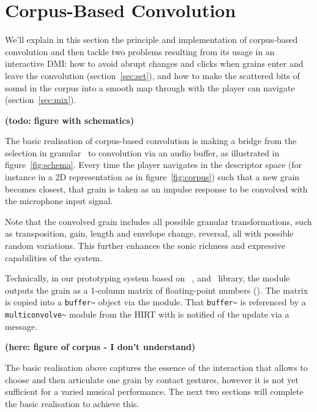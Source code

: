 \section{Corpus-Based Convolution} %

We'll explain in this section the principle and implementation of corpus-based convolution and then tackle two problems resulting from its usage in an interactive DMI: 
how to avoid abrupt changes and clicks when grains enter and leave the convolution (section~\ref{sec:set}), and
how to make the scattered bits of sound in the corpus into a smooth map through with the player can navigate (section~\ref{sec:mix}).


\textbf{(todo: figure with schematics)}

The basic realisation of corpus-based convolution is making a bridge from the selection in granular \cbcs\ to convolution via an audio buffer, as illustrated in figure~\ref{fig:schema}.  Every time the player navigates in the descriptor space (for instance in a 2D representation as in figure~\ref{fig:corpus}) such that a new grain becomes closest, that grain is taken as an impulse response to be convolved with the microphone input signal.

Note that the convolved grain includes all possible granular transformations, such as transposition, gain, length and envelope change, reversal, all with possible random variations.
This further enhances the sonic richness and expressive capabilities of the system.

Technically, in our prototyping system based on \catart\, \ftm{}, and \gabor\ library, the  module outputs the grain as a 1-column matrix of floating-point numbers ().  The matrix is copied into a \verb|buffer~| object via the  module.
That \verb|buffer~| is referenced by a \verb|multiconvolve~| module from the HIRT with is notified of the update via a message.

\textbf{(here: figure of corpus - I don't understand)}

The basic realisation above captures the essence of the interaction that allows to choose and then articulate one grain by contact gestures, however it is not yet sufficient for a varied musical performance.  The next two sections will complete the basic realisation to achieve this.


